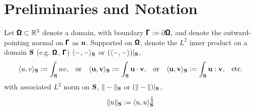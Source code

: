 \section*{Preliminaries and Notation}

    Let $\pmb{\mathsf{\Omega}}  \subset  \mathbb{R}^{3}$ denote a  domain, with boundary $\pmb{\mathsf{\Gamma}}  :=  \partial\pmb{\mathsf{\Omega}}$, and denote the outward-pointing normal on $\pmb{\mathsf{\Gamma}}$ as $\mathbf{n}$. Supported on $\pmb{\mathsf{\Omega}}$, denote the $L^{2}$ inner product on a domain $\mathbf{S}$ (e.g. $\pmb{\mathsf{\Omega}}$, $\pmb{\mathsf{\Gamma}}$) $\langle-, -\rangle_{\mathbf{S}}$ or $(\langle-, -\rangle)|_{\mathbf{S}}$,
    \begin{align}
        \langle u, v\rangle_{\mathbf{S}}  :=  \int_{\mathbf{S}}uv,  &&
        \text{or}  &&
        \langle \mathbf{u}, \mathbf{v}\rangle_{\mathbf{S}}  :=  \int_{\mathbf{S}}\mathbf{u}\cdot\mathbf{v},  &&
        \text{or}  &&
        \langle \mathbf{u}, \mathbf{v}\rangle_{\mathbf{S}}  :=  \int_{\mathbf{S}}\mathbf{u}:\mathbf{v},  &&
        \text{etc.}
    \end{align}
    with associated $L^{2}$ norm on $\mathbf{S}$, $\|-\|_{\mathbf{S}}$ or $(\|-\|)|_{\mathbf{S}}$,
    \begin{equation}
        \|u\|_{\mathbf{S}}  :=  \langle u, u\rangle_{\mathbf{S}}^{\frac{1}{2}}
    \end{equation}
    
